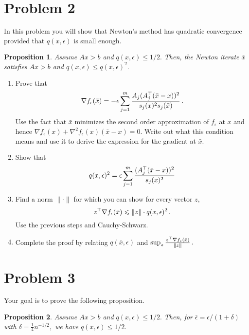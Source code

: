 \documentclass[12pt]{article}
\newtheorem{prop}{Proposition}
\begin{document}
\section*{Problem 2}

In this problem you will show that Newton's method has quadratic convergence
provided that $q(x,\epsilon)$ is small enough.

\begin{prop}
\label{prop:two}
Assume $Ax>b$ and $q(x, \epsilon)\le 1/2.$ Then, the Newton iterate $\bar x$
satisfies $A\bar x>b$ and $q(\bar x, \epsilon)\le q(x, \epsilon)^2.$
\end{prop}

\begin{enumerate}
\item
Prove that
\[
\nabla f_\epsilon(\bar x)
=
-\epsilon \sum_{j=1}^m \frac{A_j(A_j^\top(\bar x - x))^2}{s_j(x)^2s_j(\bar x)}\,.
\]
Use the fact that $\bar x$ minimizes the second order approximation of
$f_\epsilon$ at $x$ and hence $\nabla f_\epsilon(x)+ \nabla^2f_\epsilon(x)(\bar
x-x)=0.$ Write out what this condition means and use it to derive the expression
for the gradient at $\bar x.$

\item
Show that
\[
q(x, \epsilon)^2
= \epsilon\sum_{j=1}^m \frac{(A_j^\top(\bar x-x))^2}{s_j(x)^2}
\]

\item
Find a norm $\|\cdot\|$ for which you can show for every vector $z,$
\[
z^\top \nabla f_\epsilon(\bar x) 
\leqslant \|z\|\cdot q(x,\epsilon)^2\,.
\]
Use the previous steps and Cauchy-Schwarz. 

\item
Complete the proof by relating $q(\bar x, \epsilon)$
and $\sup_z 
\frac{z^\top \nabla f_\epsilon(\bar x)}{\|z\|}\,.$
\end{enumerate}


\section*{Problem 3}

Your goal is to prove the following proposition.

\begin{prop}
Assume $Ax>b$ and $q(x, \epsilon)\le1/2.$ Then, for
$\bar\epsilon=\epsilon/(1+\delta)$ with $\delta=\frac14n^{-1/2},$ we have 
$q(\bar x, \bar\epsilon)\le 1/2.$
\end{prop}
\end{document}
